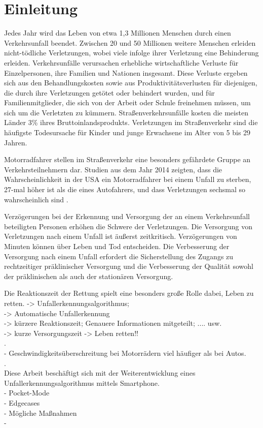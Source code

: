 \chapter{Einleitung}
%
%
%
%
%
%
Jedes Jahr wird das Leben von etwa 1,3 Millionen Menschen durch einen Verkehrsunfall beendet. Zwischen 20 und 50 Millionen weitere Menschen erleiden nicht-tödliche Verletzungen, wobei viele infolge ihrer Verletzung eine Behinderung erleiden. Verkehrsunfälle verursachen erhebliche wirtschaftliche Verluste für Einzelpersonen, ihre Familien und Nationen insgesamt. Diese Verluste ergeben sich aus den Behandlungskosten sowie aus Produktivitätsverlusten für diejenigen, die durch ihre Verletzungen getötet oder behindert wurden, und für Familienmitglieder, die sich von der Arbeit oder Schule freinehmen müssen, um sich um die Verletzten zu kümmern. Straßenverkehrsunfälle kosten die meisten Länder 3\% ihres Bruttoinlandsprodukts. Verletzungen im Straßenverkehr sind die häufigste Todesursache für Kinder und junge Erwachsene im Alter von 5 bis 29 Jahren.\cite{healthorganization2022}

Motorradfahrer stellen im Straßenverkehr eine besonders gefährdete Gruppe an Verkehrsteilnehmern dar. Studien aus dem Jahr 2014 zeigten, dass die Wahrscheinlichkeit in der USA ein Motorradfahrer bei einem Unfall zu sterben, 27-mal höher ist als die eines Autofahrers, und dass Verletzungen sechsmal so wahrscheinlich sind \cite{NHTSA}.

Verzögerungen bei der Erkennung und Versorgung der an einem Verkehrsunfall beteiligten Personen erhöhen die Schwere der Verletzungen. Die Versorgung von Verletzungen nach einem Unfall ist äußerst zeitkritisch. Verzögerungen von Minuten können über Leben und Tod entscheiden. Die Verbesserung der Versorgung nach einem Unfall erfordert die Sicherstellung des Zugangs zu rechtzeitiger präklinischer Versorgung und die Verbesserung der Qualität sowohl der präklinischen als auch der stationären Versorgung.\cite{healthorganization2022}

Die Reaktionszeit der Rettung spielt eine besonders große Rolle dabei, Leben zu retten.
-> Unfallerkennungsalgorithmus; \\
-> Automatische Unfallerkennung \\
-> kürzere Reaktionszeit; Genauere Informationen mitgeteilt; .... usw.\\
-> kurze Versorgungszeit -> Leben retten!!\\

.\\

-	Geschwindigkeitsüberschreitung bei Motorrädern viel häufiger als bei Autos.\\

.\\

Diese Arbeit beschäftigt sich mit der Weiterentwicklung eines Unfallerkennungsalgorithmus mittels Smartphone. \\
- Pocket-Mode\\
- Edgecases\\
- Mögliche Maßnahmen\\
- 











